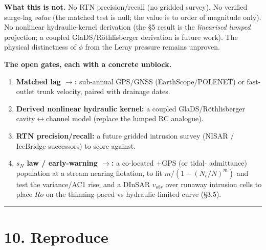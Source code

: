 \documentclass[11pt]{article}
\begin{document}
\textbf{What this is not.} No RTN precision/recall (no gridded survey). No verified surge-lag \emph{value} (the matched test is null; the value is to order of magnitude only). No nonlinear hydraulic-kernel derivation (the §5 result is the \emph{linearised lumped} projection; a coupled GlaDS/Röthlisberger derivation is future work). The physical distinctness of $\phi $ from the Leray pressure remains unproven.


\textbf{The open gates, each with a concrete unblock.}

\begin{enumerate}
\item \textbf{Matched lag \ensuremath{\to}:} sub-annual GPS/GNSS (EarthScope/POLENET) or fast-outlet trunk velocity, paired with drainage dates.
\item \textbf{Derived nonlinear hydraulic kernel:} a coupled GlaDS/Röthlisberger cavity\ensuremath{\leftrightarrow}channel model (replace the lumped RC analogue).
\item \textbf{RTN precision/recall:} a future gridded intrusion survey (NISAR / IceBridge successors) to score against.
\item \textbf{$s_{N}$ law / early-warning \ensuremath{\to}:} a co-located +GPS (or tidal- admittance) population at a stream nearing flotation, to fit $m/(1-(N_{c}/N)^{m})$ and test the variance/AC1 rise; and a DInSAR $v_{obs}$ over runaway intrusion cells to place $Ro$ on the thinning-paced vs hydraulic-limited curve (§3.5).
\end{enumerate}


\medskip\hrule\medskip


\section*{10. Reproduce}
\end{document}
